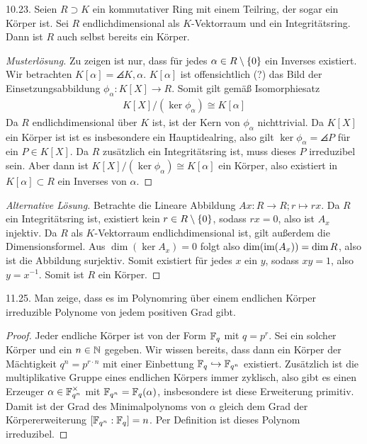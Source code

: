 \documentclass{article}
\newcommand{\ex}[1]{\tit{Übung} #1.}
\begin{document}
		\newpar
		\ex{10.23} Seien $R \supset K$ ein kommutativer Ring mit einem Teilring, der sogar ein Körper ist. Sei $R$ endlichdimensional als $K$-Vektorraum und ein Integritätsring. Dann ist $R$ auch selbst bereits ein Körper.
		\begin{proof}[Musterlösung]
			Zu zeigen ist nur, dass für jedes $\alpha \in R \setminus \qty{0}$ ein Inverses existiert. Wir betrachten $K[\alpha] = \angles{K, \alpha}$. $K[\alpha]$ ist offensichtlich (?) das Bild der Einsetzungsabbildung $\phi_\alpha : K[X] \to R$. Somit gilt gemäß Isomorphiesatz
			\begin{align*}
				K[X]/(\ker \phi_\alpha) \cong K[\alpha]
			\end{align*}
			Da $R$ endlichdimensional über $K$ ist, ist der Kern von $\phi_\alpha$ nichttrivial. Da $K[X]$ ein Körper ist ist es insbesondere ein Hauptidealring, also gilt $\ker \phi_\alpha = \angles{P}$ für ein $P \in K[X]$. Da $R$ zusätzlich ein Integritätsring ist, muss dieses $P$ irreduzibel sein. Aber dann ist $K[X]/(\ker \phi_\alpha) \cong K[\alpha]$ ein Körper, also existiert in $K[\alpha] \subset R$ ein Inverses von $\alpha$.
		\end{proof}
		\begin{proof}[Alternative Lösung]
			Betrachte die Lineare Abbildung $Ax : R \to R; r \mapsto rx$. Da $R$ ein Integritätsring ist, existiert kein $r \in R \setminus \qty{0}$, sodass $rx = 0$, also ist $A_x$ injektiv. Da $R$ als $K$-Vektorraum endlichdimensional ist, gilt außerdem die Dimensionsformel. Aus $\dim(\ker A_x) = 0$ folgt also $\dim(\textnormal{im}(A_x)) = \dim R$, also ist die Abbildung surjektiv. Somit existiert für jedes $x$ ein $y$, sodass $xy = 1$, also $y = x^{-1}$. Somit ist $R$ ein Körper.
		\end{proof}
		\newpar
		\ex{11.25} Man zeige, dass es im Polynomring über einem endlichen Körper irreduzible Polynome von jedem positiven Grad gibt.
		\begin{proof}
			Jeder endliche Körper ist von der Form $\mathbb{F}_q$ mit $q = p^r$. Sei ein solcher Körper und ein $n \in \mathbb{N}$ gegeben. Wir wissen bereits, dass dann ein Körper der Mächtigkeit $q^n = p^{r \cdot n}$ mit einer Einbettung $\mathbb{F}_q \hookrightarrow \mathbb{F}_{q^n}$ existiert.
			\newpar
			Zusätzlich ist die multiplikative Gruppe eines endlichen Körpers immer zyklisch, also gibt es einen Erzeuger $\alpha \in \mathbb{F}_{q^n}^\times$ mit $\mathbb{F}_{q^n} = \mathbb{F}_q(\alpha)$, insbesondere ist diese Erweiterung primitiv.
			\newpar
			Damit ist der Grad des Minimalpolynoms von $\alpha$ gleich dem Grad der Körpererweiterung $[\mathbb{F}_{q^n} : \mathbb{F}_q] = n$. Per Definition ist dieses Polynom irreduzibel.
		\end{proof}
\end{document}
